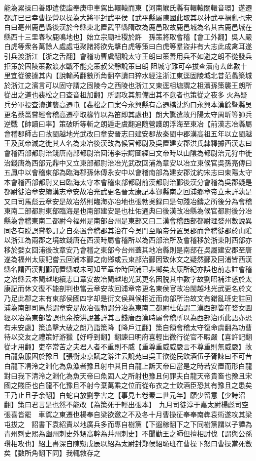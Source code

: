 能為累操曰善即遣使詣奉庚申車駕出轘轅而東【河南緱氏縣有轘轅關轘音環】遂遷都許巳已幸曹操營以操為大將軍封武平侯【武平縣屬陳國此取其以神武平禍亂也宋白曰亳州鹿邑縣後漢於今縣東北置武平縣隋改為鹿邑取故鹿邑城為名其古鹿邑城在縣西十三里春秋鹿鳴地也】始立宗廟社稷於許　孫策將取會稽【會工外翻】吳人嚴白虎等衆各萬餘人處處屯聚諸將欲先擊白虎等策曰白虎等羣盜非有大志此成禽耳遂引兵渡浙江【浙之舌翻】會稽功曹虞翻說太守王朗曰策善用兵不如避之朗不從發兵拒策於固陵策數渡水戰不能克策叔父靜說策曰朗阻城守難可卒拔查瀆南去此數十里宜從彼據其内【說輸芮翻數所角翻卒讀曰猝水經注浙江東逕固陵城北昔范蠡築城於浙江之濱言可以固守謂之固陵今之西陵也浙江又東逕柤塘謂之柤瀆孫策襲王朗所從出之道也裴松之曰查音柤加翻】所謂攻其無備出其不意者也策從之夜多火為疑兵分軍投查瀆道襲高遷屯【裴松之曰案今永興縣有高遷橋沈約曰永興本漢餘暨縣吳更名蔡邕嘗經會稽高遷亭取椽竹以為笛即其處也】朗大驚遣故丹陽太守周昕等帥兵逆戰【帥讀曰率】策破昕等斬之朗遁走虞翻追隨營護朗浮海至東冶【前漢志冶縣屬會稽郡師古曰故閩越地光武改曰章安晉志曰建安郡故秦閩中郡漢高祖五年以立閩越王及武帝滅之徙其人名為東冶後漢改為候官都尉及吳置建安郡洪氏隸釋據西漢志曰會稽西部都尉治錢唐南部都尉治回浦李宗諤圖經曰文帝時以山隂為都尉治元狩中徙治錢唐為西部元鼎中又立東部都尉治冶光武改回浦為章安以冶立東候官吳孫亮傳曰五鳳中以會稽東部為臨海郡孫休傳永安中以會稽南部為建安郡沈約宋志曰東陽太守本會稽西部都尉又曰臨海太守本會稽東部都尉前漢都尉治鄞後漢分會稽為吳郡疑是都尉徙治章安續漢志章安故冶光武更名晉太康記本鄞縣南之回浦鄉章帝立未詳孰是又曰司馬彪云章安是故冶然則臨海亦冶地也張勃吳録曰是句踐冶鑄之所後分為會稽東南二部都尉東部臨海是也南部建安是也杜佑通典曰後漢改冶縣為候官都尉後分冶縣為會稽東南二都尉今福州是南部台州是東部又曰二漢會稽西部都尉理婺州數說異同各有脱誤嘗參訂之自秦置會稽郡其治在今吳門至順帝分置吳郡而會稽徙郡於山隂以浙江為兩郡之境故錢唐在西漢時屬會稽所以為西部治所及會稽移於浙東則西部亦移於婺女回浦後改章安乃會稽之東部今台州蓋其地冶縣則是南部在吳屬建安郡至唐遂為福州太康記嘗云回浦本鄞之南鄉或云東部治鄞因致休文之疑然鄞及回浦皆西漢縣名謂西漢割鄞而置縣或未可知至章帝時回浦已非鄉矣太康所紀亦誤也前志註會稽之冶縣云本閩越地續志口章安故冶閩越地光武更名因脱其中數字故劉昭補注惑於太康記而休文復不能剖判也當云章安故回浦章帝更名東侯官故冶閩越地光武更名於文乃足此郡之末有東部侯國四字却是衍文侯與候相近而南部所治故文有錯亂班史註回浦為南部司馬彪謂章安是故冶張勃謂分冶為東南二都尉杜佑謂二漢西部皆在婺女圖經以冶為東部皆誤也余按洪說甚詳其言錢唐西漢時屬會稽所以為西部治所此語亦恐有未安處】策追擊大破之朗乃詣策降【降戶江翻】策自領會稽太守復命虞翻為功曹待以交友之禮策好游獵【好呼到翻】翻諫曰明府喜輕出微行從官不暇嚴【喜許記翻從才用翻】吏卒常苦之夫君人者不重則不威【重尊重威威嚴言不尊重則無威嚴】故白龍魚服困於豫且【張衡東京賦之辭注云說苑曰吳王欲從民飲酒伍子胥諫曰不可昔白龍下凊泠之淵化為魚漁者豫且射中其目白龍上訴天帝曰當是之時若安置而形白龍對曰我下清泠之淵化為魚天帝曰魚固人之所射也豫且何罪夫白龍天帝貴畜也豫且宋國之賤臣也白龍不化豫且不射今棄萬乘之位而從布衣之士飲酒臣恐其有豫且之患矣王乃止且子余翻】白蛇自放劉季害之【事見七卷秦二世元年】願少留意【少詩沼翻】策曰君言是也然不能改【為策死于輕出張本】　九月司徒淳于嘉太尉楊彪司空張喜皆罷　車駕之東遷也楊奉自梁欲邀之不及冬十月曹操征奉奉南犇袁術遂攻其梁屯拔之　詔書下袁紹責以地廣兵多而專自樹黨【下遐稼翻下之下同樹黨謂以子譚為青州刺史熙為幽州刺史外甥高幹為幷州刺史】不聞勤王之師但擅相討伐【謂與公孫瓚相攻也】紹上書深自陳愬戊辰以紹為太尉封鄴侯紹恥班在曹操下怒曰曹操當死數矣【數所角翻下同】我輒救存之